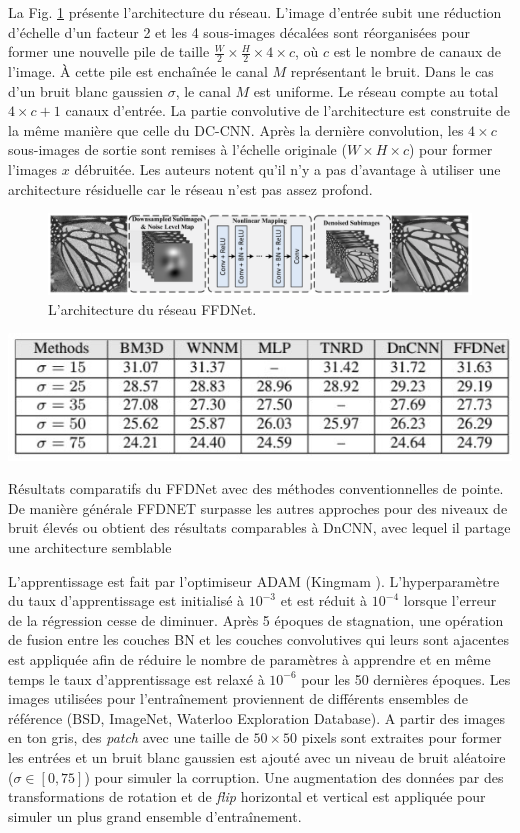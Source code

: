 La Fig. \ref{fig:FDDNet} présente l'architecture du réseau. L'image d'entrée subit une réduction d'échelle d'un facteur 2 et les 4 sous-images décalées sont réorganisées pour former une nouvelle pile de taille  $\frac{W}{2} \times \frac{H}{2} \times 4 \times c$, où $c$ est le nombre de canaux de l'image. À cette pile est enchaînée le canal $M$ représentant le bruit.  Dans le cas d'un bruit blanc gaussien $\sigma$, le canal $M$ est uniforme. Le réseau compte au total $4 \times c + 1$ canaux d'entrée. La partie convolutive de l'architecture est construite de la même manière que celle du DC-CNN.  Après la dernière convolution, les $4 \times c$ sous-images de sortie sont remises à l'échelle originale ($W \times H \times c$) pour former l'images $x$ débruitée. Les auteurs notent qu'il n'y a pas d'avantage à utiliser une architecture résiduelle car le réseau n'est pas assez profond. 

\begin{figure}
  \includegraphics[width=\linewidth]{figures/geo6393/fddnet.png}
   \centering
  \caption{L'architecture du réseau FFDNet.}
  \label{fig:FDDNet}
\end{figure}
\begin{table}
  \includegraphics[width=0.6\linewidth]{figures/geo6393/ffdnet_results_bsd68.jpg}
   \centering
  \caption{Résultats comparatifs du FFDNet avec des méthodes conventionnelles de pointe. De manière générale FFDNET surpasse les autres approches pour des niveaux de bruit élevés ou obtient des résultats comparables à DnCNN, avec  lequel il partage une architecture semblable }
  \label{tab:ffdnet_results_bsd68}
\end{table}
L'apprentissage est fait par l'optimiseur ADAM (Kingmam \cite{Kingma2014AdamAM}). L'hyperparamètre du taux d'apprentissage est initialisé à $10^{-3}$ et est réduit à $10^{-4}$ lorsque l'erreur de la régression cesse de diminuer.  Après 5 époques de stagnation, une opération de fusion entre les couches BN et les couches convolutives qui leurs sont ajacentes est appliquée afin de réduire le nombre de paramètres à apprendre et en même temps le taux d'apprentissage est relaxé à $10^{-6}$ pour les 50 dernières époques. 
Les images utilisées pour l'entraînement proviennent de différents ensembles de référence (BSD, ImageNet, Waterloo Exploration Database).  A partir des images en ton gris, des \textit{patch} avec une taille de $50 \times 50$ pixels sont extraites pour former les entrées et un bruit blanc gaussien est ajouté avec un niveau de bruit aléatoire ($\sigma \in [0, 75]$) pour simuler la corruption. Une augmentation des données par des transformations de rotation et de \textit{flip} horizontal et vertical est appliquée pour simuler un plus grand ensemble d'entraînement. 

